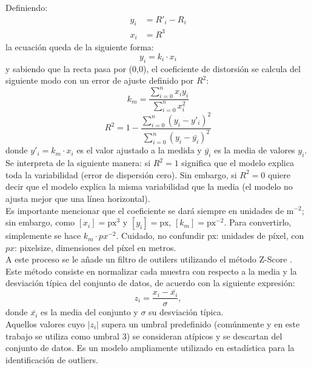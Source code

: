 \documentclass[12pt]{article}
\numberwithin{equation}{section}%
\newcommand{\lightit}[1]{{\lightitfont #1}}
\begin{document}
Definiendo:
\begin{equation*}
\begin{aligned}
y_i &= R'_i - R_i\\
x_i &= R^3
\end{aligned}
\end{equation*}
la ecuación queda de la siguiente forma:
\begin{equation}
    y_i=k_i\cdot x_i
\end{equation}
y sabiendo que la recta pasa por (0,0), el coeficiente de distorsión se calcula del siguiente modo con un error de ajuste definido por \(R^2\):
\begin{equation}
   k_m=\frac{\sum_{i=0}^{n}x_i y_i}{\sum_{i=0}^{n}x_i^2} 
   \label{eq:k_medida}
\end{equation}
\begin{equation}
   R^2 = 1 - \frac{\sum_{i=0}^{n}(y_i-y'_i)^2}{\sum_{i=0}^{n}(y_i-\bar{y_i})^2} 
   \label{eq:R2}
\end{equation}
donde \(y'_i = k_m \cdot x_i\) es el valor ajustado a la medida y \(\bar{y_i}\) es la media de valores \(y_i\). Se interpreta de la siguiente manera: si \(R^{2}=1\) significa que el modelo explica toda la variabilidad (error de dispersión cero). Sin embargo, si \(R^{2}=0\) quiere decir que el modelo explica la misma variabilidad que la media (el modelo no ajusta mejor que una línea horizontal).\\

Es importante mencionar que el coeficiente se dará siempre en unidades de $\text{m}^{-2}$; sin embargo, como \([x_i] = \text{px}^3\) y \([y_i] = \text{px}\), \([k_{m}] = \text{px}^{-2}\). Para convertirlo, simplemente se hace \(k_m \cdot px^{-2}\). Cuidado, no confundir px: unidades de píxel, con \(px\): pixelsize, dimensiones del píxel en metros.\\

A este proceso se le añade un filtro de \lightit{outilers} utilizando el método \lightit{Z-Score} \cite{montgomery2014}. Este método consiste en normalizar cada muestra con respecto a la media y la desviación típica del conjunto de datos, de acuerdo con la siguiente expresión:
\begin{equation}
    z_i = \frac{x_i - \bar{x_i}}{\sigma},
\end{equation}
donde \(\bar{x_i}\) es la media del conjunto y \(\sigma\) su desviación típica.\\

Aquellos valores cuyo \(\lvert z_i \rvert\) supera un umbral predefinido (comúnmente y en este trabajo se utiliza como umbral 3) se consideran atípicos y se descartan del conjunto de datos. Es un modelo ampliamente utilizado en estadística para la identificación de outliers.\\
\end{document}
